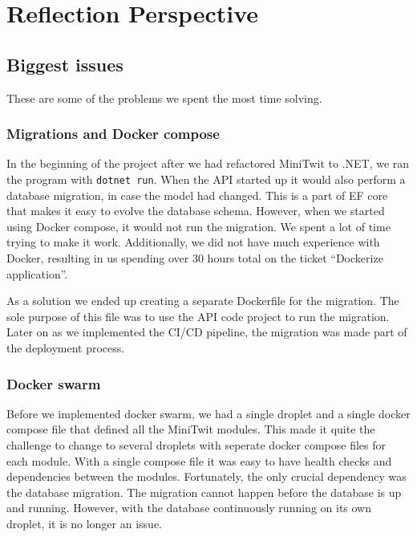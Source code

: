 \section{Reflection Perspective}

\subsection{Biggest issues}

These are some of the problems we spent the most time solving.

\subsubsection{Migrations and Docker compose}

In the beginning of the project after we had refactored MiniTwit to .NET,
we ran the program with \texttt{dotnet run}. 
When the API started up it would also perform a database migration,
in case the model had changed. This is a part of EF core
that makes it easy to evolve the database schema.
However, when we started using Docker compose, it would not run the migration.
We spent a lot of time trying to make it work.
Additionally, we did not have much experience with Docker,
resulting in us spending over 30 hours total on the ticket
``Dockerize application''.

As a solution we ended up creating a separate Dockerfile for the migration.
The sole purpose of this file was to use the API code project to run the migration.
Later on as we implemented the CI/CD pipeline, 
the migration was made part of the deployment process.

\subsubsection{Docker swarm}

Before we implemented docker swarm, we had a single droplet 
and a single docker compose file that defined all the MiniTwit modules.
This made it quite the challenge to change to several droplets with 
seperate docker compose files for each module.
With a single compose file it was easy to have health checks and
dependencies between the modules. 
Fortunately, the only crucial dependency was the database migration.
The migration cannot happen before the database is up and running.
However, with the database continuously running on its own droplet,
it is no longer an issue.

